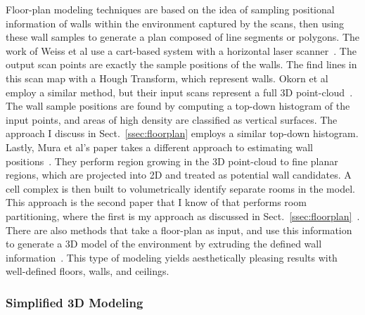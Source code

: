 \documentclass[journal]{IEEEtran}
\begin{document}
Floor-plan modeling techniques are based on the idea of sampling positional information of walls within the environment captured by the scans, then using these wall samples to generate a plan composed of line segments or polygons.  The work of Weiss et al use a cart-based system with a horizontal laser scanner~\cite{Weiss05}.  The output scan points are exactly the sample positions of the walls.  The find lines in this scan map with a Hough Transform, which represent walls.  Okorn et al employ a similar method, but their input scans represent a full 3D point-cloud~\cite{Okorn09}.  The wall sample positions are found by computing a top-down histogram of the input points, and areas of high density are classified as vertical surfaces.  The approach I discuss in Sect.~\ref{ssec:floorplan} employs a similar top-down histogram.  Lastly, Mura et al's paper takes a different approach to estimating wall positions~\cite{Mura13}.  They perform region growing in the 3D point-cloud to fine planar regions, which are projected into 2D and treated as potential wall candidates.  A cell complex is then built to volumetrically identify separate rooms in the model.  This approach is the second paper that I know of that performs room partitioning, where the first is my approach as discussed in Sect.~\ref{ssec:floorplan}~\cite{Turner14}.  There are also methods that take a floor-plan as input, and use this information to generate a 3D model of the environment by extruding the defined wall information~\cite{Or05,Lewis98}.  This type of modeling yields aesthetically pleasing results with well-defined floors, walls, and ceilings.

\subsubsection{Simplified 3D Modeling}
\label{sssec:background_planefit}
\end{document}

